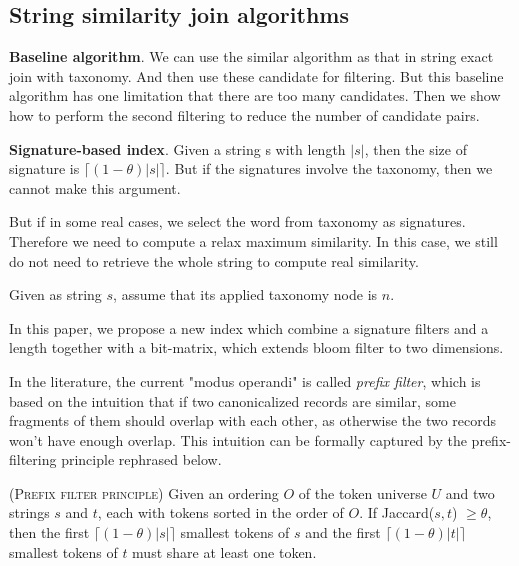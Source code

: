 \subsection{String similarity join algorithms}





\textbf{Baseline algorithm}. We can use the similar algorithm as that in string exact join with taxonomy. And then use these candidate for filtering. But this baseline algorithm has one limitation that there are too many candidates. Then we show how to perform the second filtering to reduce the number of candidate pairs.

\textbf{Signature-based index}. Given a string s with length $|s|$, then the size of signature is $\lceil (1-\theta)|s| \rceil$. But if the signatures involve the taxonomy, then we cannot make this argument.

But if in some real cases, we select the word from taxonomy as signatures. Therefore we need to compute a relax maximum similarity. In this case, we still do not need to retrieve the whole string to compute real similarity.

Given as string $s$, assume that its applied taxonomy node is $n$.

In this paper, we propose a new index which combine a signature filters and a length together with a bit-matrix, which extends bloom filter to two dimensions.

In the literature, the current "modus operandi" is called \textit{prefix filter}, which is based on the intuition that if two canonicalized records are similar, some fragments of them should overlap with each other, as otherwise the two records
won't have enough overlap. This intuition can be formally captured by the prefix-filtering
principle \cite{conf/icde/ChaudhuriGK06} rephrased below.

\begin{lem} (\textsc{Prefix filter principle}) \cite{conf/icde/ChaudhuriGK06} Given an
ordering $O$ of the token universe $U$ and two strings $s$ and $t$, each with tokens sorted in the
order of $O$.   If Jaccard($s, t$) $\geq \theta$, then the first $\lceil(1-\theta)|s|\rceil$ smallest
tokens of $s$ and the first $\lceil(1-\theta)|t|\rceil$ smallest
tokens of $t$  must share at least one token.
\end{lem}

